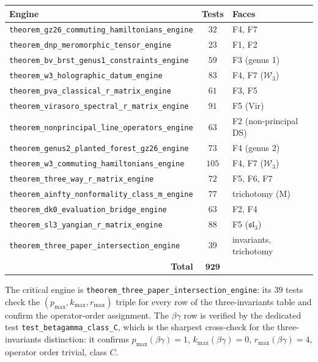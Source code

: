 \documentclass[11pt]{article}
\theoremstyle{plain}
\theoremstyle{definition}
\theoremstyle{remark}
\newcommand{\fsl}{\mathfrak{sl}}
\newcommand{\Walg}{\mathcal{W}}
\begin{document}
\begin{center}
\renewcommand{\arraystretch}{1.3}
\begin{tabular}{|l|c|l|}
\hline
\textbf{Engine} & \textbf{Tests} & \textbf{Faces} \\
\hline\hline
\texttt{theorem\_gz26\_commuting\_hamiltonians\_engine} & $32$ & F4, F7 \\
\hline
\texttt{theorem\_dnp\_meromorphic\_tensor\_engine} & $23$ & F1, F2 \\
\hline
\texttt{theorem\_bv\_brst\_genus1\_constraints\_engine} & $59$ & F3 (genus 1) \\
\hline
\texttt{theorem\_w3\_holographic\_datum\_engine} & $83$ & F4, F7 ($\Walg_3$) \\
\hline
\texttt{theorem\_pva\_classical\_r\_matrix\_engine} & $61$ & F3, F5 \\
\hline
\texttt{theorem\_virasoro\_spectral\_r\_matrix\_engine} & $91$ & F5 (Vir) \\
\hline
\texttt{theorem\_nonprincipal\_line\_operators\_engine} & $63$ & F2 (non-principal DS) \\
\hline
\texttt{theorem\_genus2\_planted\_forest\_gz26\_engine} & $73$ & F4 (genus 2) \\
\hline
\texttt{theorem\_w3\_commuting\_hamiltonians\_engine} & $105$ & F4, F7 ($\Walg_3$) \\
\hline
\texttt{theorem\_three\_way\_r\_matrix\_engine} & $72$ & F5, F6, F7 \\
\hline
\texttt{theorem\_ainfty\_nonformality\_class\_m\_engine} & $77$ & trichotomy (M) \\
\hline
\texttt{theorem\_dk0\_evaluation\_bridge\_engine} & $63$ & F2, F4 \\
\hline
\texttt{theorem\_sl3\_yangian\_r\_matrix\_engine} & $88$ & F5 ($\fsl_3$) \\
\hline
\texttt{theorem\_three\_paper\_intersection\_engine} & $39$
 & invariants, trichotomy \\
\hline\hline
\multicolumn{1}{|r|}{\textbf{Total}} & $\mathbf{929}$ &
 \multicolumn{1}{r|}{} \\
\hline
\end{tabular}
\end{center}

\noindent
The critical engine is
\texttt{theorem\_three\_paper\_intersection\_engine}: its $39$
tests check the $(p_{\max},k_{\max},r_{\max})$ triple for every row
of the three-invariants table and confirm the operator-order
assignment. The $\beta\gamma$ row is verified by the dedicated
test \texttt{test\_betagamma\_class\_C}, which is the sharpest
cross-check for the three-invariants distinction: it confirms
$p_{\max}(\beta\gamma)=1$, $k_{\max}(\beta\gamma)=0$,
$r_{\max}(\beta\gamma)=4$, operator order trivial, class $C$.
\end{document}
